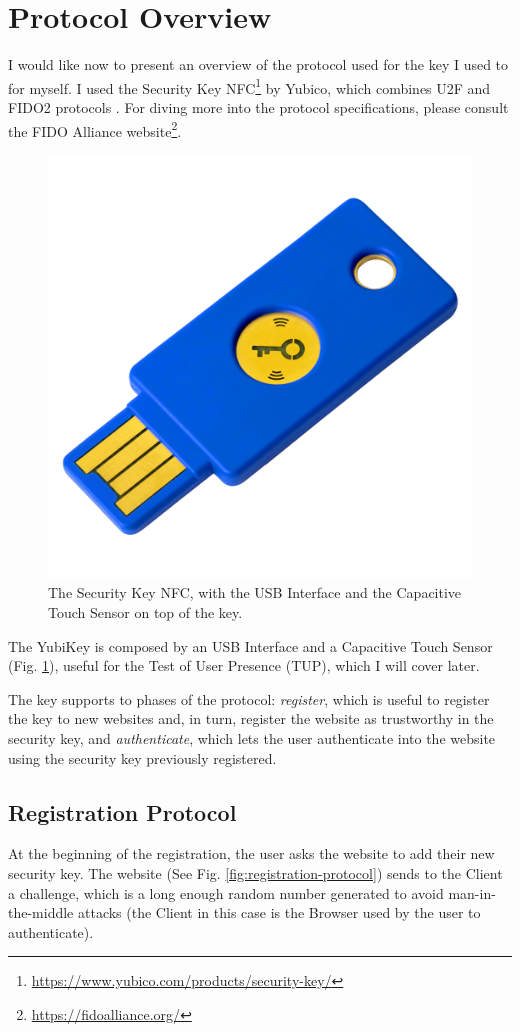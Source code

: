 \section{Protocol Overview}
I would like now to present an overview of the protocol used for the key I used to for myself. I used the Security Key NFC\footnote{\url{https://www.yubico.com/products/security-key/}} by Yubico, which combines U2F and FIDO2 protocols \cite{keysoverview}. For diving more into the protocol specifications, please consult the FIDO Alliance website\footnote{\url{https://fidoalliance.org/}}.

\begin{figure}[t]
    \centering
    \includegraphics[width=0.4\linewidth]{resources/yubikey.png}
      \caption{The Security Key NFC, with the USB Interface and the Capacitive Touch Sensor on top of the key.}
      \label{fig:key}
\end{figure}

The YubiKey is composed by an USB Interface and a Capacitive Touch Sensor (Fig. \ref{fig:key}), useful for the Test of User Presence (TUP), which I will cover later.

The key supports to phases of the protocol: \emph{register}, which is useful to register the key to new websites and, in turn, register the website as trustworthy in the security key, and \emph{authenticate}, which lets the user authenticate into the website using the security key previously registered.

\subsection{Registration Protocol}\label{registration-protocol}
At the beginning of the registration, the user asks the website to add their new security key. The website (See Fig. \ref{fig:registration-protocol}) sends to the Client a challenge, which is a long enough random number generated to avoid man-in-the-middle attacks (the Client in this case is the Browser used by the user to authenticate).

